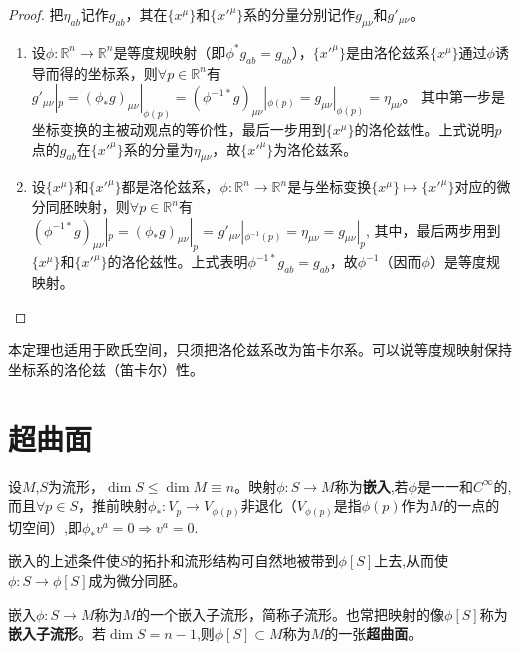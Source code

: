 \begin{proof}
	把$\eta_{ab}$记作$g_{ab}$，其在$\{x^\mu\}$和$\{x'^\mu\}$系的分量分别记作$g_{\mu\nu}$和$g'_{\mu\nu}$。
	\begin{enumerate}[（A）]
		\item 设$\phi \colon \mathbb{R}^n \to \mathbb{R}^n$是等度规映射（即$\phi^*g_{ab} = g_{ab}$），$\{x'^\mu\}$是由洛伦兹系$\{x^\mu\}$通过$\phi$诱导而得的坐标系，则$\forall p \in \mathbb{R}^n$有
		      $g'_{\mu\nu}|_p = (\phi_*g)_{\mu\nu}|_{\phi(p)} = (\phi^{-1*}g)_{\mu\nu}|_{\phi(p)} = g_{\mu\nu}|_{\phi(p)} = \eta_{\mu\nu}$。
		      其中第一步是坐标变换的主被动观点的等价性，最后一步用到$\{x^\mu\}$的洛伦兹性。上式说明$p$点的$g_{ab}$在$\{x'^\mu\}$系的分量为$\eta_{\mu\nu}$，故$\{x'^\mu\}$为洛伦兹系。
		\item 设$\{x^\mu\}$和$\{x'^\mu\}$都是洛伦兹系，$\phi \colon \mathbb{R}^n \to \mathbb{R}^n$是与坐标变换$\{x^\mu\} \mapsto \{x'^\mu\}$对应的微分同胚映射，则$\forall p \in \mathbb{R}^n$有
		      $(\phi^{-1*}g)_{\mu\nu}|_p = (\phi_*g)_{\mu\nu}|_p = g'_{\mu\nu}|_{\phi^{-1}(p)} = \eta_{\mu\nu} = g_{\mu\nu}|_p$,
		      其中，最后两步用到$\{x^\mu\}$和$\{x'^\mu\}$的洛伦兹性。上式表明$\phi^{-1*}g_{ab} = g_{ab}$，故$\phi^{-1}$（因而$\phi$）是等度规映射。
	\end{enumerate}
\end{proof}

\begin{note}
	本定理也适用于欧氏空间，只须把洛伦兹系改为笛卡尔系。可以说等度规映射保持坐标系的洛伦兹（笛卡尔）性。
\end{note}

\section{超曲面}

\begin{definition}
	设$M$,$S$为流形，$\dim S \le \dim M \equiv n$。映射$\phi \colon S \to M$称为\textbf{嵌入},若$\phi$是一一和$C^\infty$的,而且$\forall p \in S$，推前映射$\phi_* \colon V_p \to V_{\phi(p)}$非退化（$V_{\phi(p)}$是指$\phi(p)$作为$M$的一点的切空间）,即$\phi_*v^a = 0 \Rightarrow v^a = 0$.
\end{definition}

\begin{note}
	嵌入的上述条件使$S$的拓扑和流形结构可自然地被带到$\phi[S]$上去,从而使$\phi \colon S \to \phi[S]$成为微分同胚。
\end{note}

\begin{definition}
	嵌入$\phi \colon S \to M$称为$M$的一个嵌入子流形，简称子流形。也常把映射的像$\phi[S]$称为\textbf{嵌入子流形}。若$\dim S = n - 1$,则$\phi[S] \subset M$称为$M$的一张\textbf{超曲面}。
\end{definition}


